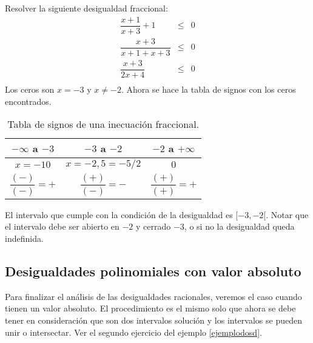 \begin{myexample}
Resolver la siguiente desigualdad fraccional:\\
\begin{eqnarray}
\dfrac{x+1}{x+3}+1&\leq &0 \\
\dfrac{x+3}{x+1+x+3} &\leq &0 \\
\dfrac{x+3}{2x+4}& \leq & 0 \\
\end{eqnarray} 
Los ceros son $x=-3$ y $x\neq -2$. Ahora se hace la tabla de signos con los ceros encontrados.\\
\begin{center}
\begin{table}[h!]
\centering
\begin{tabular}{|c|c|c|}
\hline
$-\infty$ a $-3$&$-3$ a $-2$& $-2$ a $+\infty$ \\
\hline
$x=-10$&$x=-2,5=-5/2$&$0$ \\
$\dfrac{(-)}{(-)}=+$&$\dfrac{(+)}{(-)}=-$&$\dfrac{(+)}{(+)}=+$ \\
\hline 
\end{tabular}
\caption[Tabla de signos de una inecuación fraccional.]{Tabla de signos de una inecuación fraccional.}
\end{table}
\end{center}
El intervalo que cumple con la condición de la desigualdad es $[-3,-2[$. Notar que el intervalo debe ser abierto en $-2$ y cerrado $-3$, o si no la desigualdad queda indefinida.
\end{myexample}

\subsection{Desigualdades polinomiales con valor absoluto}
Para finalizar el análisis de las desigualdades racionales, veremos el caso cuando tienen un valor absoluto. El procedimiento es el mismo solo que ahora se debe tener en consideración que son dos intervalos solución y los intervalos se pueden unir o intersectar. Ver el segundo ejercicio del ejemplo \ref{ejemplodosd}.

